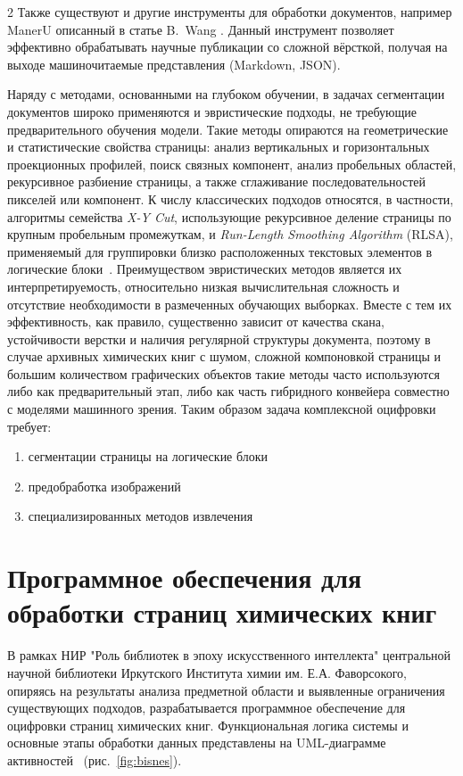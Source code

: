 \documentclass[11pt]{article}
\begin{document}
\begin{multicols}{2}
Также существуют и другие инструменты для обработки документов, например ManerU описанный в статье B.~Wang \cite{refMinerU}. Данный инструмент позволяет эффективно обрабатывать научные публикации со сложной вёрсткой, получая на выходе машиночитаемые представления (Markdown, JSON).

Наряду с методами, основанными на глубоком обучении, в задачах сегментации документов широко применяются и эвристические подходы, не требующие предварительного обучения модели. Такие методы опираются на геометрические и статистические свойства страницы: анализ вертикальных и горизонтальных проекционных профилей, поиск связных компонент, анализ пробельных областей, рекурсивное разбиение страницы, а также сглаживание последовательностей пикселей или компонент. К числу классических подходов относятся, в частности, алгоритмы семейства \textit{X-Y Cut}, использующие рекурсивное деление страницы по крупным пробельным промежуткам, и \textit{Run-Length Smoothing Algorithm} (RLSA), применяемый для группировки близко расположенных текстовых элементов в логические блоки~\cite{refXYCut,refRLSA}. Преимуществом эвристических методов является их интерпретируемость, относительно низкая вычислительная сложность и отсутствие необходимости в размеченных обучающих выборках. Вместе с тем их эффективность, как правило, существенно зависит от качества скана, устойчивости верстки и наличия регулярной структуры документа, поэтому в случае архивных химических книг с шумом, сложной компоновкой страницы и большим количеством графических объектов такие методы часто используются либо как предварительный этап, либо как часть гибридного конвейера совместно с моделями машинного зрения. 
Таким образом задача комплексной оцифровки требует:
\begin{enumerate}
	\item сегментации страницы на логические блоки
	\item предобработка изображений 
	\item специализированных методов извлечения
\end{enumerate} 
\section{Программное обеспечения для обработки страниц химических книг}
В рамках НИР "Роль библиотек в эпоху искусственного интеллекта" центральной научной библиотеки Иркутского Института химии им. Е.А. Фаворсокого, опиряясь на результаты анализа предметной области и выявленные ограничения существующих подходов, разрабатывается программное обеспечение для оцифровки страниц химических книг. Функциональная логика системы и основные этапы обработки данных представлены на UML-диаграмме активностей~\cite{refUML} (рис.~\ref{fig:bisnes}).


\end{multicols}
\end{document}
